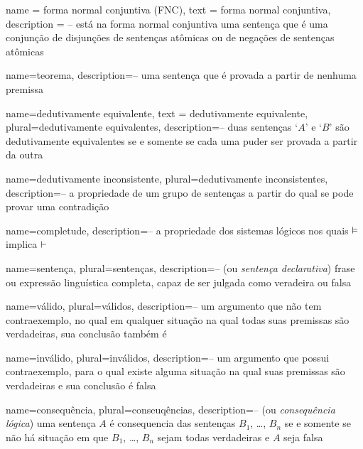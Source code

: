 {
  name = forma normal conjuntiva (FNC),
  text = forma normal conjuntiva,
  description = {-- está na forma normal conjuntiva uma sentença que é uma conjunção de disjunções de sentenças atômicas ou de negações de sentenças atômicas}
}

  
  {
  name=teorema,
  description={-- uma sentença que é provada a partir de nenhuma premissa}
  }
  
  {
    name=dedutivamente equivalente,
    text = dedutivamente equivalente,
    plural=dedutivamente equivalentes,
  description={-- duas sentenças `$A$' e `$B$' são  dedutivamente equivalentes  se e somente se cada  uma puder ser provada a partir da outra}
  }
  
  {    name={dedutivamente inconsistente}, 
       plural={dedutivamente inconsistentes},
    description={-- a propriedade de um grupo de sentenças a partir do qual se pode provar uma contradição}
  }

  {
  name=completude,
  description={-- a propriedade dos sistemas lógicos nos quais $\vDash $ implica $\vdash$}
  }

  {
  name=sentença,
  plural=sentenças,
  description={-- (ou \textit{sentença declarativa}) frase ou expressão linguística completa, capaz de ser julgada como veradeira ou falsa}
  }
  
  {
  name=válido,
  plural=válidos,
  description={-- um argumento que não tem contraexemplo, no qual em qualquer situação na qual todas suas premissas são verdadeiras, sua conclusão também é}
  }
  
  {
  name=inválido,
  plural=inválidos,
  description={-- um argumento que possui contraexemplo, para o qual existe alguma situação na qual suas premissas são verdadeiras e sua conclusão é falsa}
  }
  
    {
    name=consequência,
    plural=conseuqências,
    description={-- (ou \textit{consequência lógica}) uma sentença $A$ é consequencia das sentenças $B_1$, \dots, $B_n$ se e somente se não há situação em que $B_1$, \dots, $B_n$ sejam todas verdadeiras e $A$ seja falsa}
    }
  
